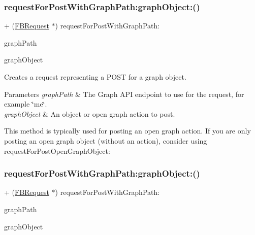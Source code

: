 \subsubsection{\texorpdfstring{request\+For\+Post\+With\+Graph\+Path\+:graph\+Object\+:()}{requestForPostWithGraphPath:graphObject:()}\hspace{0.1cm}{\footnotesize\ttfamily [2/5]}}
{\footnotesize\ttfamily + (\hyperlink{interfaceFBRequest}{F\+B\+Request} $\ast$) request\+For\+Post\+With\+Graph\+Path\+: \begin{DoxyParamCaption}\item[{(N\+S\+String $\ast$)}]{graph\+Path }\item[{graphObject:(id$<$ \hyperlink{interfaceFBGraphObject}{F\+B\+Graph\+Object} $>$)}]{graph\+Object }\end{DoxyParamCaption}}

Creates a request representing a P\+O\+ST for a graph object.


\begin{DoxyParams}{Parameters}
{\em graph\+Path} & The Graph A\+PI endpoint to use for the request, for example \char`\"{}me\char`\"{}.\\
\hline
{\em graph\+Object} & An object or open graph action to post.\\
\hline
\end{DoxyParams}
This method is typically used for posting an open graph action. If you are only posting an open graph object (without an action), consider using {\ttfamily request\+For\+Post\+Open\+Graph\+Object\+:} \mbox{\label{interfaceFBRequest_ac3f506dd49d0757265f44b41c9579c8b}} 
\subsubsection{\texorpdfstring{request\+For\+Post\+With\+Graph\+Path\+:graph\+Object\+:()}{requestForPostWithGraphPath:graphObject:()}\hspace{0.1cm}{\footnotesize\ttfamily [3/5]}}
{\footnotesize\ttfamily + (\hyperlink{interfaceFBRequest}{F\+B\+Request} $\ast$) request\+For\+Post\+With\+Graph\+Path\+: \begin{DoxyParamCaption}\item[{(N\+S\+String $\ast$)}]{graph\+Path }\item[{graphObject:(id$<$ \hyperlink{interfaceFBGraphObject}{F\+B\+Graph\+Object} $>$)}]{graph\+Object }\end{DoxyParamCaption}}

